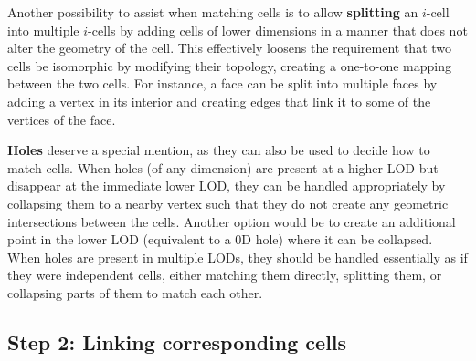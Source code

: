 Another possibility to assist when matching cells is to allow \textbf{splitting} an $i$-cell into multiple $i$-cells by adding cells of lower dimensions in a manner that does not alter the geometry of the cell.
This effectively loosens the requirement that two cells be isomorphic by modifying their topology, creating a one-to-one mapping between the two cells.
For instance, a face can be split into multiple faces by adding a vertex in its interior and creating edges that link it to some of the vertices of the face.

\textbf{Holes} deserve a special mention, as they can also be used to decide how to match cells.
When holes (of any dimension) are present at a higher LOD but disappear at the immediate lower LOD, they can be handled appropriately by collapsing them to a nearby vertex such that they do not create any geometric intersections between the cells.
Another option would be to create an additional point in the lower LOD (equivalent to a 0D hole) where it can be collapsed.
When holes are present in multiple LODs, they should be handled essentially as if they were independent cells, either matching them directly, splitting them, or collapsing parts of them to match each other.

\subsection{Step 2: Linking corresponding cells}
\label{ss:linkingrules}

